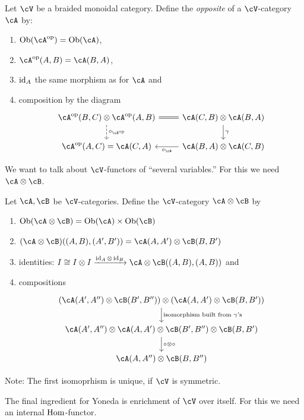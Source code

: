 \documentclass[a4paper,11pt,oneside,openany]{scrbook}
\begin{document}
\begin{defn}
	Let $ \cV $ be a braided monoidal category.
	Define the \emph{opposite} of a $ \cV $-category~$ \cA $ by:
	\begin{enumerate}[label=$\bullet$]
		\item $ \Ob(\cA^{\op}) = \Ob(\cA) $,
		\item $ \cA^{\op}(A,B) = \cA(B,A) $,
		\item $ \operatorname{id}_A $ the same morphism as for $ \cA $ and
		\item composition by the diagram
		      \begin{displaymath}
			      \begin{tikzcd}
				      \cA^{\op}(B,C)\otimes \cA^{\op}(A,B)\arrow[r, equal] \arrow[d, dashed, "\circ_{\cA^{\op}}"]& \cA(C,B)\otimes \cA(B,A) \arrow[d, "\gamma"] \\
				      \cA^{\op}(A,C) = \cA(C,A) & \cA(B,A)\otimes \cA(C,B) \arrow[l, "\circ_\cA"]
			      \end{tikzcd}
		      \end{displaymath}
	\end{enumerate}
\end{defn}
We want to talk about $ \cV $-functors of ``several variables.''
For this we need $ \cA \otimes \cB$.
\begin{defn}
	Let $ \cA,\cB $ be $ \cV $-categories.
	Define the $ \cV $-category $ \cA \otimes \cB $ by
	\begin{enumerate}[label=$ \bullet $]
		\item $ \Ob(\cA\otimes \cB) = \Ob(\cA) \times \Ob(\cB) $
		\item $ (\cA\otimes\cB)((A,B),(A',B')) = \cA(A,A')\otimes \cB(B,B') $
		\item identities: $ I \iso I\otimes I \xrightarrow{\id_A \otimes \id_B} \cA\otimes\cB((A,B),(A,B)) $ and
		\item compositions
		      \begin{displaymath}
			      \begin{tikzcd}
				      (\cA(A',A'') \otimes \cB(B',B'')) \otimes (\cA(A,A') \otimes \cB(B,B'))
				      \arrow[d, "\text{isomorphism built from $ \gamma $'s}"]
				      \\
				      \cA(A',A'') \otimes \cA(A,A')\otimes \cB(B',B'')\otimes \cB(B,B')
				      \arrow[d, "\circ\otimes\circ"]\\
				      \cA(A,A'')\otimes \cB(B,B'')
			      \end{tikzcd}
		      \end{displaymath}
	\end{enumerate}
	Note: The first isomoprhism is unique, if $ \cV $ is symmetric.
\end{defn}
The final ingredient for Yoneda is enrichment of $ \cV $ over itself.
For this we need an internal $ \operatorname{\text{Hom}} $-functor.
\end{document}
